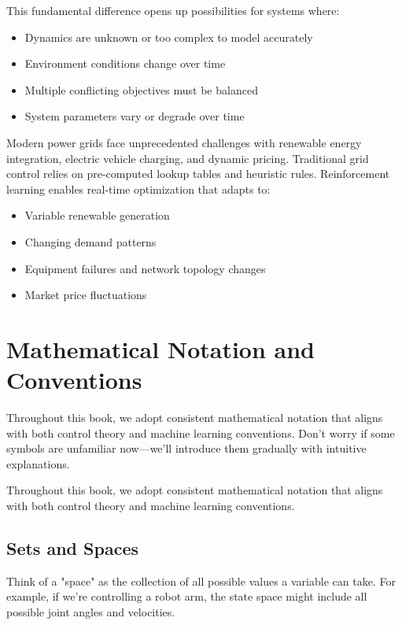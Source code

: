 This fundamental difference opens up possibilities for systems where:
\begin{itemize}
    \item Dynamics are unknown or too complex to model accurately
    \item Environment conditions change over time
    \item Multiple conflicting objectives must be balanced
    \item System parameters vary or degrade over time
\end{itemize}

\begin{examplebox}
Modern power grids face unprecedented challenges with renewable energy integration, electric vehicle charging, and dynamic pricing. Traditional grid control relies on pre-computed lookup tables and heuristic rules. Reinforcement learning enables real-time optimization that adapts to:
\begin{itemize}
    \item Variable renewable generation
    \item Changing demand patterns
    \item Equipment failures and network topology changes
    \item Market price fluctuations
\end{itemize}
\end{examplebox}

\section{Mathematical Notation and Conventions}

\begin{notebox}
Throughout this book, we adopt consistent mathematical notation that aligns with both control theory and machine learning conventions. Don't worry if some symbols are unfamiliar now—we'll introduce them gradually with intuitive explanations.
\end{notebox}

Throughout this book, we adopt consistent mathematical notation that aligns with both control theory and machine learning conventions.

\subsection{Sets and Spaces}

\begin{intuitionbox}
Think of a "space" as the collection of all possible values a variable can take. For example, if we're controlling a robot arm, the state space might include all possible joint angles and velocities.
\end{intuitionbox}

